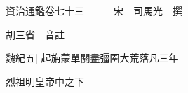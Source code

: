 






























































資治通鑑卷七十三　　　宋　司馬光　撰

胡三省　音註

魏紀五|{
	起旃蒙單閼盡彊圉大荒落凡三年}


烈祖明皇帝中之下


